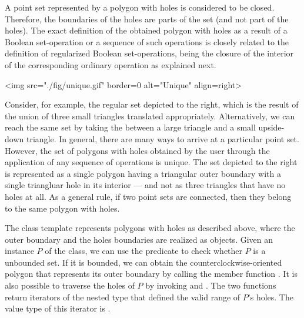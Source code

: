 A point set represented by a polygon with holes is considered to be
closed. Therefore, the boundaries of the holes are parts of the set
(and not part of the holes).
The exact definition of the obtained polygon with holes as a result of
a Boolean set-operation or a sequence of such operations is closely
related to the definition of regularized Boolean set-operations, being
the closure of the interior of the corresponding ordinary operation as
explained next.
\newpage
\lcTex{%
  \setlength{\widthRight}{1.4cm}
  \setlength{\widthLeft}{\widthLineReal}
  \addtolength{\widthLeft}{-\widthRight}
  \begin{minipage}{\widthLeft}
}
\label{fig:unique}
\begin{ccHtmlOnly}
  <img src="./fig/unique.gif" border=0 alt="Unique" align=right>
\end{ccHtmlOnly}
Consider, for example, the regular set depicted to the right, which is
the result of the union of three small triangles translated
appropriately. Alternatively, we can reach the same set by taking the 
 between a large triangle and a small
upside-down triangle. In general, there are many ways to arrive at 
a particular point set. However, the set of polygons with holes
obtained by the user through the application of any sequence of
operations is unique. The set depicted to the right is represented as
a single polygon having a triangular outer boundary with a single
triangluar hole in its interior --- and not as three triangles that
have no holes at all. As a general rule, if two point sets are
connected, then they belong to the same polygon with holes.

The class template  represents
polygons with holes as described above, where the outer boundary and the
holes boundaries are realized as  objects.
Given an instance $P$ of the  class, we can use
the predicate  to check whether $P$ is a unbounded set.
If it is bounded, we can obtain the counterclockwise-oriented polygon that
represents its outer boundary by calling the member function
.
It is also possible to traverse the holes of $P$ by invoking
 and . The two functions return
iterators of the nested type
 that
defined the valid range of $P$'s holes. The value type of this iterator
is .

